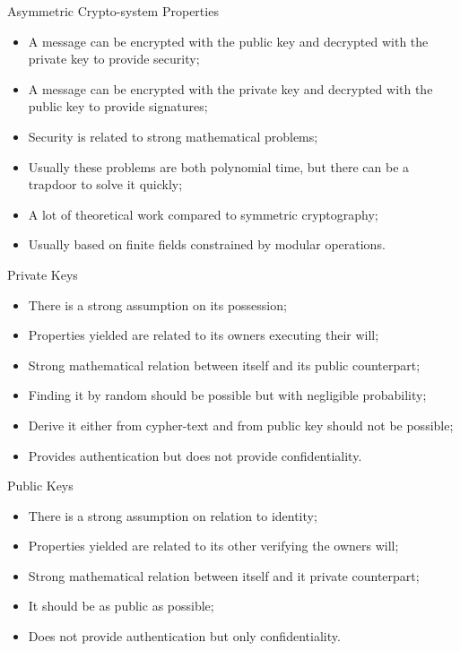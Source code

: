 \documentclass[12pt,table,xcolor={dvipsnames}]{beamer}
\begin{document}
\begin{frame}{Asymmetric Crypto-system Properties}
\begin{itemize}
\item A message can be encrypted with the public key and decrypted with the private key to provide security;\pause
\item A message can be encrypted with the private key and decrypted with the public key to provide signatures;\pause
\item Security is related to strong mathematical problems;\pause
\item Usually these problems are both polynomial time, but there can be a trapdoor to solve it quickly;\pause
\item A lot of theoretical work compared to symmetric cryptography;\pause
\item Usually based on finite fields constrained by modular operations.\pause
\end{itemize}
\end{frame}

\begin{frame}{Private Keys}
\begin{itemize}
\item There is a strong assumption on its possession;\pause
\item Properties yielded are related to its owners executing their will;\pause
\item Strong mathematical relation between itself and its public counterpart;\pause
\item Finding it by random should be possible but with negligible probability;\pause
\item Derive it either from cypher-text and from public key should not be possible;\pause
\item Provides authentication but does not provide confidentiality.
\end{itemize}
\end{frame}

\begin{frame}{Public Keys}
\begin{itemize}
\item There is a strong assumption on relation to identity;\pause
\item Properties yielded are related to its other verifying the owners will;\pause
\item Strong mathematical relation between itself and it private counterpart;\pause
\item It should be as public as possible;\pause
\item Does not provide authentication but only confidentiality.
\end{itemize}
\end{frame}
\end{document}
